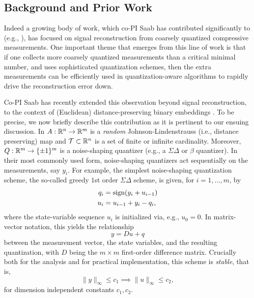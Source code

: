 \subsection{Background and Prior Work}Indeed a growing body of work, which co-PI Saab has contributed significantly to (e.g., \cite{SaabIEEEIT,knudson2016one,saab2018quantization,LybrandSaab2018,iwen2019new}), has focused on signal reconstruction from coarsely quantized compressive measurements. One important theme that emerges from this line of work  is that if one collects more coarsely quantized measurements than a critical minimal number, and uses sophisticated quantization schemes, then the extra measurements can be efficiently used in quantization-aware algorithms to rapidly drive the reconstruction error down.

Co-PI Saab has recently  extended this observation  beyond signal reconstruction, to the context of (Euclidean) distance-preserving binary embeddings \cite{huynh2018fast}. To be precise, we now briefly describe this contribution as it is pertinent to our ensuing discussion. In \cite{huynh2018fast}  $A: \mathbb{R}^n \to \mathbb{R}^m$ is a \emph{random} Johnson-Lindenstrauss (i.e., distance preserving) map and  $\mathcal{T}\subset \mathbb{R}^n$ is a set of finite or infinite cardinality. Moreover, $Q:\mathbb{R}^m \to \{\pm 1\}^m$ is a noise-shaping quantizer (e.g., a $\Sigma\Delta$ \cite{stuff} or $\beta$ \cite{stuff} quantizer). In their most commonly used form, noise-shaping quantizers act sequentially on the measurements, say $y_i$. For example, the simplest noise-shaping quantization scheme, the so-called greedy $1$st order $\Sigma\Delta$ scheme, is given, for $i=1,...,m$, by 
\begin{align}
    q_i &= \mathrm{sign}(y_i+u_{i-1})\\
    u_i &= u_{i-1} + y_i -q_i,
\end{align}
where the state-variable sequence $u_i$ is initialized via, e.g., $u_0=0$. In matrix-vector notation, this yields the relationship \begin{equation}y=Du+q\label{eq:SD_state}\end{equation}  between the measurement vector, the state variables, and the resulting quantization, with $D$ being the $m\times m$ first-order difference matrix. Crucially both for the analysis and for practical implementation, this scheme is \emph{stable}, that is, \begin{equation}\|y\|_\infty \leq c_1 \implies \|u\|_\infty \leq c_2,\label{eq:stability}\end{equation}
for dimension independent constants $c_1,c_2$.

